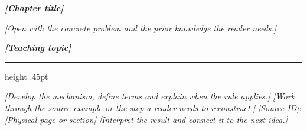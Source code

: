 \documentclass[UTF8,scheme=plain,a4paper,11pt]{ctexart}
\newcommand{\chaptertitle}[1]{\par{\LARGE\sffamily\bfseries\color{titleblue}#1\par}\nobreak\smallskip}
\newcommand{\pref}[1]{{\footnotesize\color{darktext}#1}}
\newcommand{\topicsection}[1]{%
  \par\Needspace{4\baselineskip}\addvspace{8pt}%
  {\large\sffamily\bfseries\color{titleblue}#1\par}\nobreak
  {\color{barblue}\hrule height .45pt}\nobreak\smallskip
}
\newcommand{\subquestion}[1]{\par\Needspace{3\baselineskip}{\sffamily\bfseries #1\par}\nobreak}
\newcommand{\examref}[1]{{\footnotesize\color{redline}#1}}
\newcommand{\sourceref}[2]{\pref{#1: #2}}
\newcommand{\assessref}[2]{\examref{#1: #2}}
\newcommand{\step}[2]{\par\noindent{\bfseries #1}\enspace #2\par}
\newcommand{\prnslot}[1]{\textit{[#1]}}
\begin{document}
\chaptertitle{\prnslot{Chapter title}}
\prnslot{Open with the concrete problem and the prior knowledge the reader needs.}

\topicsection{\prnslot{Teaching topic}}
\prnslot{Develop the mechanism, define terms and explain when the rule applies.}
\prnslot{Work through the source example or the step a reader needs to reconstruct.}
\sourceref{\prnslot{Source ID}}{\prnslot{Physical page or section}}
\prnslot{Interpret the result and connect it to the next idea.}

\end{document}
